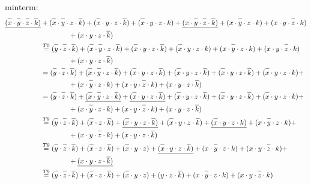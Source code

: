 \documentclass{article}
\begin{document}
minterm:
\begin{align*}
  \underline{(\overline{x\mathstrut} \cdot \overline{y\mathstrut} \cdot \overline{z\mathstrut} \cdot \overline{k\mathstrut})} &+ (\overline{x\mathstrut} \cdot \overline{y\mathstrut} \cdot z \cdot \overline{k\mathstrut}) + (\overline{x\mathstrut} \cdot y \cdot z \cdot \overline{k\mathstrut}) + (\overline{x\mathstrut} \cdot y \cdot z \cdot k) + \underline{(x \cdot \overline{y\mathstrut} \cdot \overline{z\mathstrut} \cdot \overline{k\mathstrut})} + (x \cdot \overline{y\mathstrut} \cdot z \cdot k) + (x \cdot y \cdot \overline{z\mathstrut} \cdot k)\\
  &\quad\quad\quad\quad + (x \cdot y \cdot z \cdot \overline{k\mathstrut})\\
  &\overset{T9}{=} (\overline{y\mathstrut} \cdot \overline{z\mathstrut} \cdot \overline{k\mathstrut}) + (\overline{x\mathstrut} \cdot \overline{y\mathstrut} \cdot z \cdot \overline{k\mathstrut}) + (\overline{x\mathstrut} \cdot y \cdot z \cdot \overline{k\mathstrut}) + (\overline{x\mathstrut} \cdot y \cdot z \cdot k) + (x \cdot \overline{y\mathstrut} \cdot z \cdot k) + (x \cdot y \cdot \overline{z\mathstrut} \cdot k)\\
  &\quad\quad\quad\quad + (x \cdot y \cdot z \cdot \overline{k\mathstrut})\\
  &= (\overline{y\mathstrut} \cdot \overline{z\mathstrut} \cdot \overline{k\mathstrut}) + (\overline{x\mathstrut} \cdot \overline{y\mathstrut} \cdot z \cdot \overline{k\mathstrut}) + (\overline{x\mathstrut} \cdot y \cdot z \cdot \overline{k\mathstrut}) + (\overline{x\mathstrut} \cdot y \cdot z \cdot \overline{k\mathstrut}) + (\overline{x\mathstrut} \cdot y \cdot z \cdot \overline{k\mathstrut}) + (\overline{x\mathstrut} \cdot y \cdot z \cdot k) + \\
  &\quad\quad\quad\quad + (x \cdot \overline{y\mathstrut} \cdot z \cdot k) + (x \cdot y \cdot \overline{z\mathstrut} \cdot k) + (x \cdot y \cdot z \cdot \overline{k\mathstrut})\\
  &= (\overline{y\mathstrut} \cdot \overline{z\mathstrut} \cdot \overline{k\mathstrut}) + \underline{(\overline{x\mathstrut} \cdot \overline{y\mathstrut} \cdot z \cdot \overline{k\mathstrut})} + \underline{(\overline{x\mathstrut} \cdot y \cdot z \cdot \overline{k\mathstrut})} + (\overline{x\mathstrut} \cdot y \cdot z \cdot \overline{k\mathstrut}) + (\overline{x\mathstrut} \cdot y \cdot z \cdot \overline{k\mathstrut}) + (\overline{x\mathstrut} \cdot y \cdot z \cdot k) + \\
  &\quad\quad\quad\quad + (x \cdot \overline{y\mathstrut} \cdot z \cdot k) + (x \cdot y \cdot \overline{z\mathstrut} \cdot k) + (x \cdot y \cdot z \cdot \overline{k\mathstrut})\\
  &\overset{T9}{=} (\overline{y\mathstrut} \cdot \overline{z\mathstrut} \cdot \overline{k\mathstrut}) + (\overline{x\mathstrut} \cdot z \cdot \overline{k\mathstrut}) + \underline{(\overline{x\mathstrut} \cdot y \cdot z \cdot \overline{k\mathstrut})} + (\overline{x\mathstrut} \cdot y \cdot z \cdot \overline{k\mathstrut}) + \underline{(\overline{x\mathstrut} \cdot y \cdot z \cdot k)} + (x \cdot \overline{y\mathstrut} \cdot z \cdot k) + \\
  &\quad\quad\quad\quad + (x \cdot y \cdot \overline{z\mathstrut} \cdot k) + (x \cdot y \cdot z \cdot \overline{k\mathstrut})\\
  &\overset{T9}{=} (\overline{y\mathstrut} \cdot \overline{z\mathstrut} \cdot \overline{k\mathstrut}) + (\overline{x\mathstrut} \cdot z \cdot \overline{k\mathstrut}) + (\overline{x\mathstrut} \cdot y \cdot z) + \underline{(\overline{x\mathstrut} \cdot y \cdot z \cdot \overline{k\mathstrut})} + (x \cdot \overline{y\mathstrut} \cdot z \cdot k) + (x \cdot y \cdot \overline{z\mathstrut} \cdot k) + \\
  &\quad\quad\quad\quad + \underline{(x \cdot y \cdot z \cdot \overline{k\mathstrut})}\\
  &\overset{T9}{=} (\overline{y\mathstrut} \cdot \overline{z\mathstrut} \cdot \overline{k\mathstrut}) + (\overline{x\mathstrut} \cdot z \cdot \overline{k\mathstrut}) + (\overline{x\mathstrut} \cdot y \cdot z) + (y \cdot z \cdot \overline{k\mathstrut}) + (x \cdot \overline{y\mathstrut} \cdot z \cdot k) + (x \cdot y \cdot \overline{z\mathstrut} \cdot k)
\end{align*}
\end{document}
